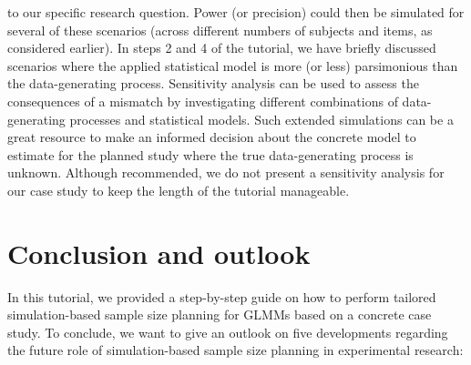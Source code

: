 \documentclass[
  man,
  floatsintext,
  longtable,
  a4paper,
  nolmodern,
  notxfonts,
  notimes,
  colorlinks=true,linkcolor=blue,citecolor=blue,urlcolor=blue]{apa7}
\begin{document}
to our specific research question. Power (or precision) could then be
simulated for several of these scenarios (across different numbers of
subjects and items, as considered earlier). In steps 2 and 4 of the
tutorial, we have briefly discussed scenarios where the applied
statistical model is more (or less) parsimonious than the
data-generating process. Sensitivity analysis can be used to assess the
consequences of a mismatch by investigating different combinations of
data-generating processes and statistical models. Such extended
simulations can be a great resource to make an informed decision about
the concrete model to estimate for the planned study where the true
data-generating process is unknown. Although recommended, we do not
present a sensitivity analysis for our case study to keep the length of
the tutorial manageable.

\section{Conclusion and outlook}\label{conclusion-and-outlook}

In this tutorial, we provided a step-by-step guide on how to perform
tailored simulation-based sample size planning for GLMMs based on a
concrete case study. To conclude, we want to give an outlook on five
developments regarding the future role of simulation-based sample size
planning in experimental research:
\end{document}
